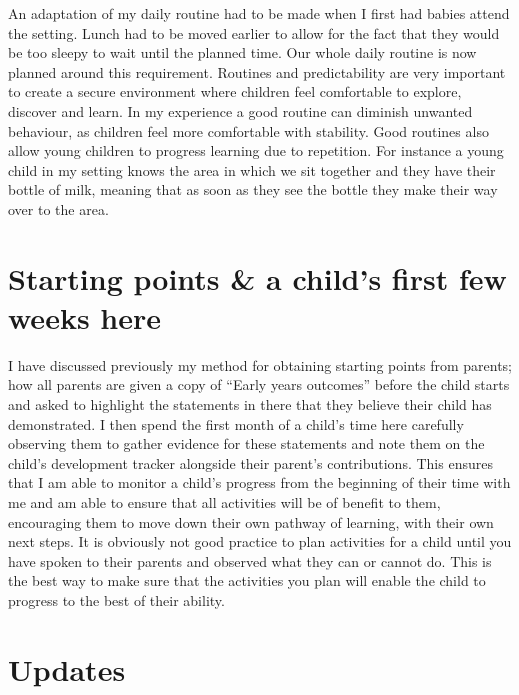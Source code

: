 \documentclass[10pt,a4paper]{report}
\begin{document}
An adaptation of my daily routine had to be made when I first had babies attend the setting. Lunch had to be moved earlier to allow for the fact that they would be too sleepy to wait until the planned time. Our whole daily routine is now planned around this requirement. Routines and predictability are very important to create a secure environment where children feel comfortable to explore, discover and learn. In my experience a good routine can diminish unwanted  behaviour, as children feel more comfortable with stability. Good routines also allow young children to progress learning due to repetition. For instance a young child in my setting knows the area in which we sit together and they have their bottle of milk, meaning that as soon as they see the bottle they make their way over to the area. 

\section{Starting points \& a child's first few weeks here}

I have discussed previously my method for obtaining starting points from parents; how all parents are given a copy of “Early years outcomes” before the child starts and asked to highlight the statements in there that they believe their child has demonstrated. I then spend the first month of a child's time here carefully observing them to gather evidence for these statements and note them on the child's development tracker alongside their parent's contributions. This ensures that I am able to monitor a child's progress from the beginning of their time with me and am able to ensure that all activities will be of benefit to them, encouraging them to move down their own pathway of learning, with their own next steps. It is obviously not good practice to plan activities for a child until you have spoken to their parents and observed what they can or cannot do. This is the best way to make sure that the activities you plan will enable the child to progress to the best of their ability.

\section{Updates}
\end{document}
